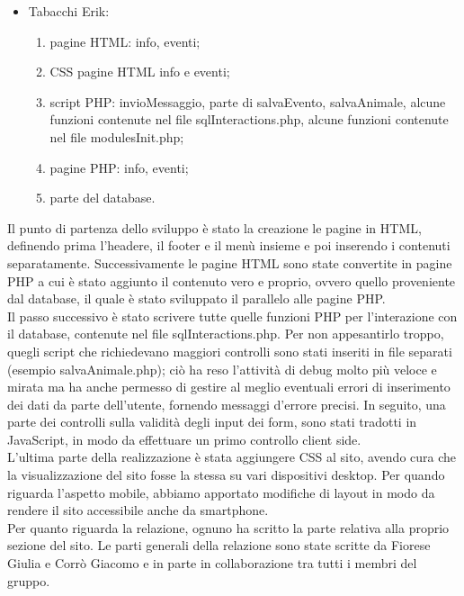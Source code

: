 \begin{itemize}
\begin{enumerate}
        \end{enumerate}
    \item Tabacchi Erik:
        \begin{enumerate}
            \item pagine HTML: info, eventi;
            \item CSS pagine HTML info e eventi;
            \item script PHP: invioMessaggio, parte di salvaEvento, salvaAnimale, alcune funzioni contenute nel file sqlInteractions.php, alcune funzioni contenute nel file modulesInit.php;
            \item pagine PHP: info, eventi;
            \item parte del database.
        \end{enumerate}
\end{itemize}
Il punto di partenza dello sviluppo è stato la creazione le pagine in HTML, definendo prima l'headere, il footer e il menù insieme e poi inserendo i contenuti separatamente. Successivamente le pagine HTML sono state convertite in pagine PHP a cui è stato aggiunto il contenuto vero e proprio, ovvero quello proveniente dal database, il quale è stato sviluppato il parallelo alle pagine PHP. \\
Il passo successivo è stato scrivere tutte quelle funzioni PHP per l'interazione con il database, contenute nel file sqlInteractions.php. Per non appesantirlo troppo, quegli script che richiedevano maggiori controlli sono stati inseriti in file separati (esempio salvaAnimale.php); ciò ha reso l'attività di debug molto più veloce e mirata ma ha anche permesso di gestire al meglio eventuali errori di inserimento dei dati da parte dell'utente, fornendo messaggi d'errore precisi.
In seguito, una parte dei controlli sulla validità degli input dei form, sono stati tradotti in JavaScript, in modo da effettuare un primo controllo client side.\\
L'ultima parte della realizzazione è stata aggiungere CSS al sito, avendo cura che la visualizzazione del sito fosse la stessa su vari dispositivi desktop. Per quando riguarda l'aspetto mobile, abbiamo apportato modifiche di layout in modo da rendere il sito accessibile anche da smartphone.\\
Per quanto riguarda la relazione, ognuno ha scritto la parte relativa alla proprio sezione del sito. Le parti generali della relazione sono state scritte da Fiorese Giulia e Corrò Giacomo e in parte in collaborazione tra tutti i membri del gruppo.
\pagebreak

